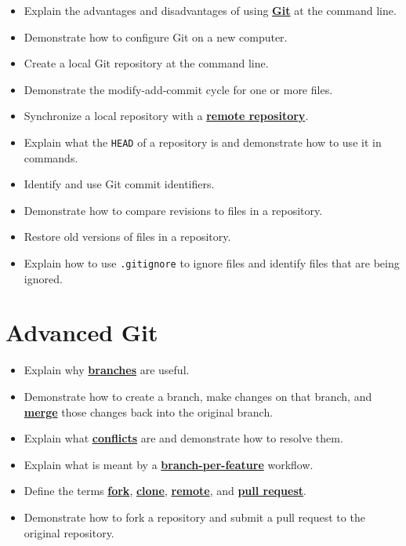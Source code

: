 \documentclass[
]{krantz}
\providecommand{\tightlist}{%
  \setlength{\itemsep}{0pt}\setlength{\parskip}{0pt}}
\newcommand{\gref}[2]{\hyperlink{#2}{\textbf{#1}}}
\begin{document}
\begin{itemize}
\tightlist
\item
  Explain the advantages and disadvantages of using \gref{Git}{git} at the command line.
\item
  Demonstrate how to configure Git on a new computer.
\item
  Create a local Git repository at the command line.
\item
  Demonstrate the modify-add-commit cycle for one or more files.
\item
  Synchronize a local repository with a \gref{remote repository}{remote\_repository}.
\item
  Explain what the \texttt{HEAD} of a repository is and demonstrate how to use it in commands.
\item
  Identify and use Git commit identifiers.
\item
  Demonstrate how to compare revisions to files in a repository.
\item
  Restore old versions of files in a repository.
\item
  Explain how to use \texttt{.gitignore} to ignore files and identify files that are being ignored.
\end{itemize}

\hypertarget{advanced-git}{%
\section{Advanced Git}\label{advanced-git}}

\begin{itemize}
\tightlist
\item
  Explain why \gref{branches}{git\_branch} are useful.
\item
  Demonstrate how to create a branch, make changes on that branch, and \gref{merge}{git\_merge} those changes back into the original branch.
\item
  Explain what \gref{conflicts}{git\_conflict} are and demonstrate how to resolve them.
\item
  Explain what is meant by a \gref{branch-per-feature}{branch\_per\_feature} workflow.
\item
  Define the terms \gref{fork}{git\_fork}, \gref{clone}{git\_clone}, \gref{remote}{remote\_repository}, and \gref{pull request}{pull\_request}.
\item
  Demonstrate how to fork a repository and submit a pull request to the original repository.
\end{itemize}
\end{document}
